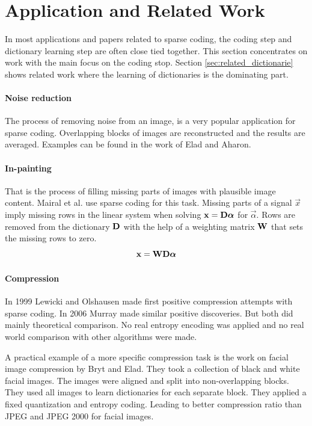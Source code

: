 \section{Application and Related Work}
\label{sec:sparse_related}
In most applications and papers related to sparse coding, the coding
step and dictionary learning step are often close tied together. This
section concentrates on work with the main focus on the coding stop. Section
\ref{sec:related_dictionarie} shows related work where the learning of
dictionaries is the dominating part.

\paragraph{Noise reduction} The process of removing noise from an image, is a
very popular application for sparse coding. Overlapping blocks of images are
reconstructed and the results are averaged. Examples can be found in the work of
Elad and Aharon\cite{Elad2006}.

\paragraph{In-painting} That is the process of filling missing parts of images
with plausible image content. Mairal et al.\cite{mairal08sparse} use sparse
coding for this task. Missing parts of a signal $\vec{x}$ imply missing rows in
the linear system when solving $\boldsymbol{\mathrm{x}} = \boldsymbol{\mathrm{D}}\boldsymbol{\mathrm{\alpha}}$ for
$\vec{\alpha}$. Rows are removed from the dictionary $\boldsymbol{\mathrm{D}}$ with the help of
a weighting matrix $\boldsymbol{\mathrm{W}}$ that sets the missing rows to zero.
\begin{equation*}
\boldsymbol{\mathrm{x}} = \boldsymbol{\mathrm{W}}\boldsymbol{\mathrm{D}}\boldsymbol{\mathrm{\alpha}}\\
\end{equation*}


\paragraph{Compression} In 1999 Lewicki and Olshausen\cite{Lewicki1999} made
first positive compression attempts with sparse coding. In 2006
Murray\cite{Murray2006} made similar positive discoveries. But both did mainly
theoretical comparison. No real entropy encoding was applied and no real world
comparison with other algorithms were made.

A practical example of a more specific compression task is the work on
facial image compression by Bryt and Elad\cite{Bryt2008}. They took a
collection of black and white facial images. The images were aligned and
split into non-overlapping blocks. They used all images to learn
dictionaries for each separate block. They applied a fixed quantization and
entropy coding. Leading to better compression ratio than JPEG and JPEG 2000 for
  facial images.

